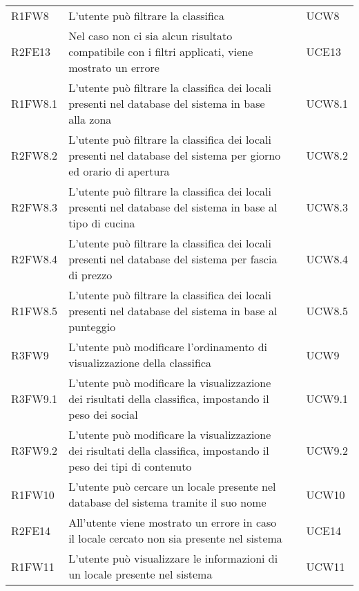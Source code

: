 \begin{longtable}{ m{}<{\centering}  m{}<{\centering}  m{}<{\centering}  m{}<{\centering}}
	R1FW8 & L’utente può filtrare la classifica & \Ob & UCW8\\		
	
	R2FE13 & Nel caso non ci sia alcun risultato compatibile con i filtri applicati, viene mostrato un errore & \De & UCE13\\	
	 
	R1FW8.1 & L’utente può filtrare la classifica dei locali presenti nel database del sistema in base alla zona & \Ob & UCW8.1\\	
	 
	R2FW8.2 & L’utente può filtrare la classifica dei locali presenti nel database del sistema per giorno ed orario di apertura & \De & UCW8.2\\	
	 
	R2FW8.3 & L’utente può filtrare la classifica dei locali presenti nel database del sistema in base al tipo di cucina & \De & UCW8.3\\	
	 
	R2FW8.4 & L’utente può filtrare la classifica dei locali presenti nel database del sistema per fascia di prezzo & \De & UCW8.4\\	 
	 
	R1FW8.5 & L’utente può filtrare la classifica dei locali presenti nel database del sistema in base al punteggio & \Ob & UCW8.5\\	 
	 
	R3FW9 & L’utente può modificare l’ordinamento di visualizzazione della classifica & \Fa & UCW9\\	
	 
	R3FW9.1 & L’utente può modificare la visualizzazione dei risultati della classifica, impostando il peso dei social & \Fa & UCW9.1\\	 
	 
	R3FW9.2 & L’utente può modificare la visualizzazione dei risultati della classifica, impostando il peso dei tipi di contenuto & \Fa & UCW9.2\\	  
	 
	R1FW10 & L’utente può cercare un locale presente nel database del sistema tramite il suo nome & \Ob & UCW10 \\	 
	 
	R2FE14 & All’utente viene mostrato un errore in caso il locale cercato non sia presente nel sistema & \De & UCE14\\	 
	 	 
	R1FW11 & L’utente può visualizzare le informazioni di un locale presente nel sistema & \Ob & UCW11\\	 	 	 	


\end{longtable}
